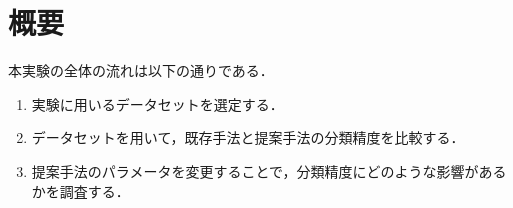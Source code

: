 \section{概要}
本実験の全体の流れは以下の通りである．

\begin{enumerate}
  \item 実験に用いるデータセットを選定する．
  \item データセットを用いて，既存手法と提案手法の分類精度を比較する．
  \item 提案手法のパラメータを変更することで，分類精度にどのような影響があるかを調査する．
\end{enumerate}